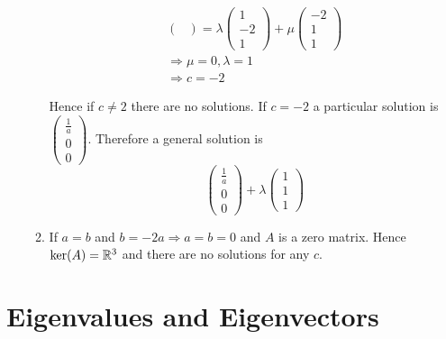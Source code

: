 \documentclass{article}
\numberwithin{equation}{section}
\begin{document}
\begin{eg}
\begin{enumerate}[label=(\arabic*)]
\begin{enumerate}
\begin{align*}
\begin{pmatrix}
                \end{pmatrix}
                = \lambda \begin{pmatrix}
                    1 \\ -2 \\ 1
                \end{pmatrix}
                + \mu \begin{pmatrix}
                    -2 \\ 1 \\ 1
                \end{pmatrix} \\
                \Rightarrow \mu = 0, \lambda =1 \\
                \Rightarrow c = -2
            \end{align*}

            Hence if $c \neq 2$ there are no solutions. 
            If $c = -2$ a particular solution is $\begin{pmatrix}
                \frac{1}{a} \\ 0 \\ 0
            \end{pmatrix}$. Therefore a general solution is
            \[
                \begin{pmatrix}
                    \frac{1}{a} \\ 0 \\ 0
                \end{pmatrix}
                + \lambda \begin{pmatrix}
                    1 \\ 1 \\ 1
                \end{pmatrix}  
            \]

            \item If $a = b$ and $b = -2a \Rightarrow a = b = 0$ and $A$ is a zero matrix.
            Hence $\ker(A) = \mathbb{R}^3$ and there are no solutions for any $c$.
        \end{enumerate}
    \end{enumerate}
\end{eg}

\section{Eigenvalues and Eigenvectors}
\end{document}
